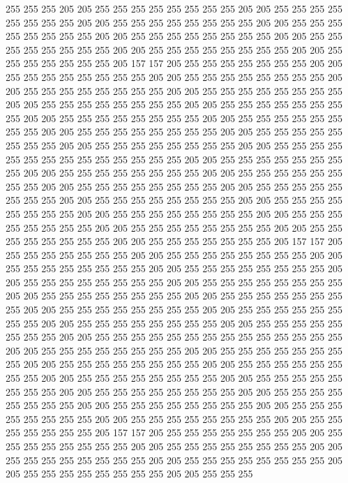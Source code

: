 255 255 255 205 205 255 255 255 255 255 255 255 255 205 205 255 255 255 255 255
255 255 255 205 205 255 255 255 255 255 255 255 255 205 205 255 255 255 255 255
255 255 255 205 205 255 255 255 255 255 255 255 255 205 205 255 255 255 255 255
255 255 255 205 205 255 255 255 255 255 255 255 255 205 205 255 255 255 255 255
255 255 205 157 157 205 255 255 255 255 255 255 255 205 205 255 255 255 255 255
255 255 255 205 205 255 255 255 255 255 255 255 255 205 205 255 255 255 255 255
255 255 255 205 205 255 255 255 255 255 255 255 255 205 205 255 255 255 255 255
255 255 255 205 205 255 255 255 255 255 255 255 255 205 205 255 255 255 255 255
255 255 255 205 205 255 255 255 255 255 255 255 255 205 205 255 255 255 255 255
255 255 255 205 205 255 255 255 255 255 255 255 255 205 205 255 255 255 255 255
255 255 255 205 205 255 255 255 255 255 255 255 255 255 255 255 255 255 255 205
205 255 255 255 255 255 255 255 255 205 205 255 255 255 255 255 255 255 255 205
205 255 255 255 255 255 255 255 255 205 205 255 255 255 255 255 255 255 255 205
205 255 255 255 255 255 255 255 255 205 205 255 255 255 255 255 255 255 255 205
205 255 255 255 255 255 255 255 255 205 205 255 255 255 255 255 255 255 255 205
205 255 255 255 255 255 255 255 255 205 205 255 255 255 255 255 255 255 255 205
205 255 255 255 255 255 255 255 255 205 205 255 255 255 255 255 255 255 205 157
157 205 255 255 255 255 255 255 255 205 205 255 255 255 255 255 255 255 255 205
205 255 255 255 255 255 255 255 255 205 205 255 255 255 255 255 255 255 255 205
205 255 255 255 255 255 255 255 255 205 205 255 255 255 255 255 255 255 255 205
205 255 255 255 255 255 255 255 255 205 205 255 255 255 255 255 255 255 255 205
205 255 255 255 255 255 255 255 255 205 205 255 255 255 255 255 255 255 255 205
205 255 255 255 255 255 255 255 255 205 205 255 255 255 255 255 255 255 255 205
205 255 255 255 255 255 255 255 255 255 255 255 255 255 255 205 205 255 255 255
255 255 255 255 255 205 205 255 255 255 255 255 255 255 255 205 205 255 255 255
255 255 255 255 255 205 205 255 255 255 255 255 255 255 255 205 205 255 255 255
255 255 255 255 255 205 205 255 255 255 255 255 255 255 255 205 205 255 255 255
255 255 255 255 255 205 205 255 255 255 255 255 255 255 255 205 205 255 255 255
255 255 255 255 255 205 205 255 255 255 255 255 255 255 255 205 205 255 255 255
255 255 255 255 255 205 205 255 255 255 255 255 255 255 205 157 157 205 255 255
255 255 255 255 255 205 205 255 255 255 255 255 255 255 255 205 205 255 255 255
255 255 255 255 255 205 205 255 255 255 255 255 255 255 255 205 205 255 255 255
255 255 255 255 255 205 205 255 255 255 255 255 255 255 255 205 205 255 255 255
